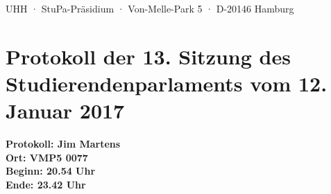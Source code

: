 \documentclass[ngerman,headheight=70pt]{scrartcl}
\begin{document}
    UHH · StuPa-Präsidium · Von-Melle-Park 5 · D-20146 Hamburg

    \section*{Protokoll der 13. Sitzung des Studierendenparlaments vom 12. Januar 2017}

    \textbf{Protokoll: Jim Martens}\\
    \textbf{Ort: VMP5 0077}\\
    \textbf{Beginn: 20.54 Uhr}\\
    \textbf{Ende: 23.42 Uhr}

    \vspace{0.5cm}
\end{document}

